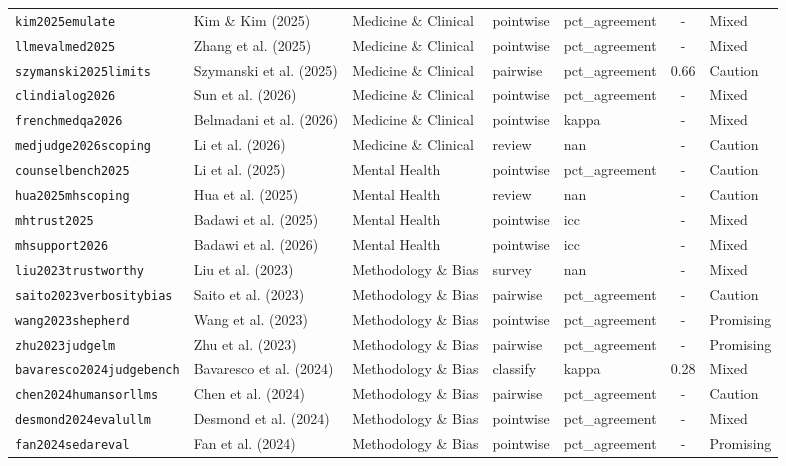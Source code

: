 \begin{longtable}{@{}l l l l l c l@{}}
\texttt{kim2025emulate} & Kim \& Kim (2025) & Medicine \& Clinical & pointwise & pct\_agreement & - & Mixed \\
\texttt{llmevalmed2025} & Zhang et al. (2025) & Medicine \& Clinical & pointwise & pct\_agreement & - & Mixed \\
\texttt{szymanski2025limits} & Szymanski et al. (2025) & Medicine \& Clinical & pairwise & pct\_agreement & 0.66 & Caution \\
\texttt{clindialog2026} & Sun et al. (2026) & Medicine \& Clinical & pointwise & pct\_agreement & - & Mixed \\
\texttt{frenchmedqa2026} & Belmadani et al. (2026) & Medicine \& Clinical & pointwise & kappa & - & Mixed \\
\texttt{medjudge2026scoping} & Li et al. (2026) & Medicine \& Clinical & review & nan & - & Caution \\
\texttt{counselbench2025} & Li et al. (2025) & Mental Health & pointwise & pct\_agreement & - & Caution \\
\texttt{hua2025mhscoping} & Hua et al. (2025) & Mental Health & review & nan & - & Caution \\
\texttt{mhtrust2025} & Badawi et al. (2025) & Mental Health & pointwise & icc & - & Mixed \\
\texttt{mhsupport2026} & Badawi et al. (2026) & Mental Health & pointwise & icc & - & Mixed \\
\texttt{liu2023trustworthy} & Liu et al. (2023) & Methodology \& Bias & survey & nan & - & Mixed \\
\texttt{saito2023verbositybias} & Saito et al. (2023) & Methodology \& Bias & pairwise & pct\_agreement & - & Caution \\
\texttt{wang2023shepherd} & Wang et al. (2023) & Methodology \& Bias & pointwise & pct\_agreement & - & Promising \\
\texttt{zhu2023judgelm} & Zhu et al. (2023) & Methodology \& Bias & pairwise & pct\_agreement & - & Promising \\
\texttt{bavaresco2024judgebench} & Bavaresco et al. (2024) & Methodology \& Bias & classify & kappa & 0.28 & Mixed \\
\texttt{chen2024humansorllms} & Chen et al. (2024) & Methodology \& Bias & pairwise & pct\_agreement & - & Caution \\
\texttt{desmond2024evalullm} & Desmond et al. (2024) & Methodology \& Bias & pointwise & pct\_agreement & - & Mixed \\
\texttt{fan2024sedareval} & Fan et al. (2024) & Methodology \& Bias & pointwise & pct\_agreement & - & Promising \\

\end{longtable}
